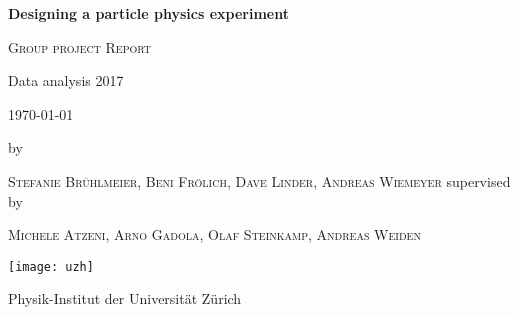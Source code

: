 \documentclass[12pt,a4paper,oneside,english]{article}
\begin{document}
\lstset{language=Python}
	\begin{titlepage}
		\centering
		{\huge\bfseries Designing a particle physics experiment \par}
		\vspace{1cm}
		{\scshape\Large Group project Report\par}
		{Data analysis 2017\par}
		{\today\par}\par
		\vspace{1cm}
		by\par
		\textsc{Stefanie Brühlmeier, Beni Frölich, Dave Linder, Andreas Wiemeyer}
		\vspace{1cm}
		\vspace{1cm}
		supervised by\par
		 \textsc{Michele Atzeni, Arno Gadola, Olaf Steinkamp, Andreas Weiden}
		\vspace{1cm}\par
		\vspace{5cm}
		\texttt{[image: uzh]}\par
		\vspace{0.5cm}
		\Large{Physik-Institut der Universität Zürich}
	\end{titlepage}
	\tableofcontents
	\pagebreak
\end{document}
